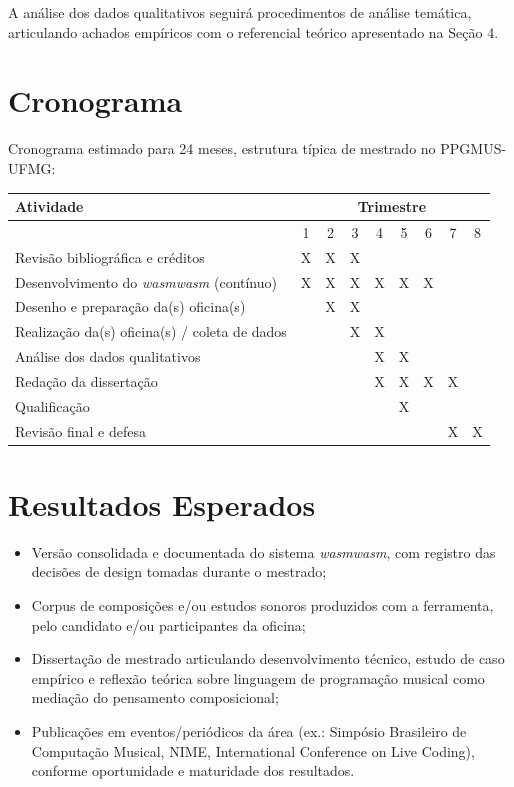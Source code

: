 \documentclass[12pt,a4paper]{article}
\begin{document}
A análise dos dados qualitativos seguirá procedimentos de análise temática, articulando achados empíricos com o referencial teórico apresentado na Seção 4.

\section{Cronograma}

Cronograma estimado para 24 meses, estrutura típica de mestrado no PPGMUS-UFMG:

\begin{center}
\begin{tabular}{|p{7cm}|c|c|c|c|c|c|c|c|}
\hline
\textbf{Atividade} & \multicolumn{8}{c|}{\textbf{Trimestre}} \\
\hline
 & 1 & 2 & 3 & 4 & 5 & 6 & 7 & 8 \\
\hline
Revisão bibliográfica e créditos & X & X & X & & & & & \\
\hline
Desenvolvimento do \emph{wasmwasm} (contínuo) & X & X & X & X & X & X & & \\
\hline
Desenho e preparação da(s) oficina(s) & & X & X & & & & & \\
\hline
Realização da(s) oficina(s) / coleta de dados & & & X & X & & & & \\
\hline
Análise dos dados qualitativos & & & & X & X & & & \\
\hline
Redação da dissertação & & & & X & X & X & X & \\
\hline
Qualificação & & & & & X & & & \\
\hline
Revisão final e defesa & & & & & & & X & X \\
\hline
\end{tabular}
\end{center}

\section{Resultados Esperados}

\begin{itemize}
  \item Versão consolidada e documentada do sistema \emph{wasmwasm}, com registro das decisões de design tomadas durante o mestrado;
  \item Corpus de composições e/ou estudos sonoros produzidos com a ferramenta, pelo candidato e/ou participantes da oficina;
  \item Dissertação de mestrado articulando desenvolvimento técnico, estudo de caso empírico e reflexão teórica sobre linguagem de programação musical como mediação do pensamento composicional;
  \item Publicações em eventos/periódicos da área (ex.: Simpósio Brasileiro de Computação Musical, NIME, International Conference on Live Coding), conforme oportunidade e maturidade dos resultados.
\end{itemize}
\end{document}
